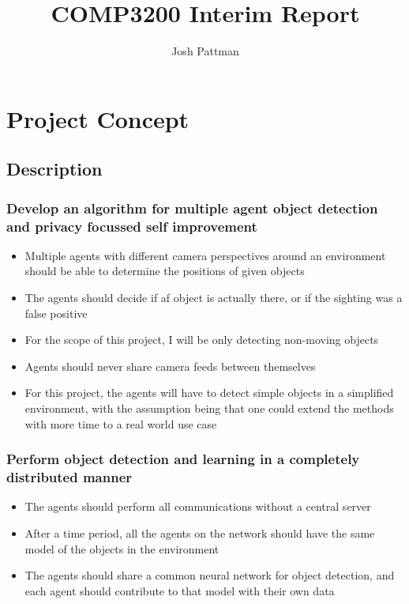 \documentclass[10pt,a4paper,titlepage]{report}
\title{COMP3200 Interim Report}
\author{Josh Pattman}
\begin{document}
	\maketitle
	\section{Project Concept}
	\subsection{Description}
	\subsubsection{Develop an algorithm for multiple agent object detection and privacy focussed self improvement}
	\begin{itemize}
		\item Multiple agents with different camera perspectives around an environment should be able to determine the positions of given objects
		\item The agents should decide if af object is actually there, or if the sighting was a false positive
		\item For the scope of this project, I will be only detecting non-moving objects
		\item Agents should never share camera feeds between themselves
		\item For this project, the agents will have to detect simple objects in a simplified environment, with the assumption being that one could extend the methods with more time to a real world use case
	\end{itemize}

	\subsubsection{Perform object detection and learning in a completely distributed manner}
	\begin{itemize}
		\item The agents should perform all communications without a central server
		\item After a time period, all the agents on the network should have the same model of the objects in the environment
		\item The agents should share a common neural network for object detection, and each agent should contribute to that model with their own data
	\end{itemize}
\end{document}
